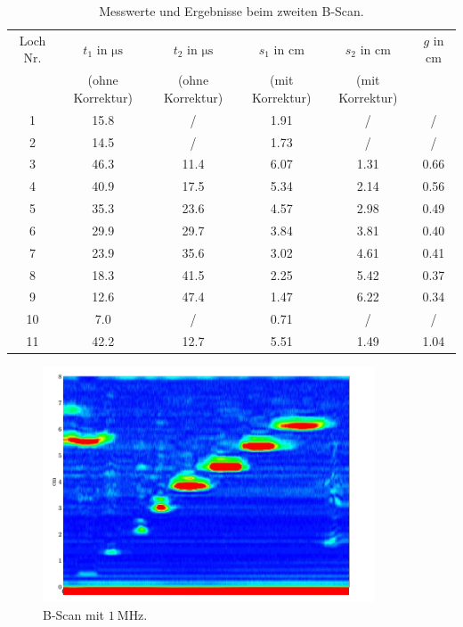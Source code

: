\documentclass[
  bibliography=totoc,     %
  captions=tableheading,  %
  titlepage=firstiscover, %
]{scrartcl}
\begin{document}
\begin{table}[H]
  \centering
  \caption{Messwerte und Ergebnisse beim zweiten B-Scan.}
  \label{tab:messwerte4}
  \begin{tabular}{S[table-format=2.1] S S S[table-format=1.2] S[table-format=1.2] S[table-format=2.2]}
    \toprule
    {Loch Nr.} & {$t_1$ in $\si{\micro\second}$} & {$t_2$ in $\si{\micro\second}$} & {$s_1$ in $\si{\centi\meter}$} & {$s_2$ in $\si{\centi\meter}$} & {$g$ in $\si{\centi\meter}$} \\
    & {(ohne Korrektur)} & {(ohne Korrektur)} & {(mit Korrektur)} & {(mit Korrektur)} & \\
     & 15.8 &   /  & 1.91 &  /   &  /   \\
     2 & 14.5 &   /  & 1.73 &  /   &  /   \\
     3 & 46.3 & 11.4 & 6.07 & 1.31 & 0.66 \\
     4 & 40.9 & 17.5 & 5.34 & 2.14 & 0.56 \\
     5 & 35.3 & 23.6 & 4.57 & 2.98 & 0.49 \\
     6 & 29.9 & 29.7 & 3.84 & 3.81 & 0.40 \\
     7 & 23.9 & 35.6 & 3.02 & 4.61 & 0.41 \\
     8 & 18.3 & 41.5 & 2.25 & 5.42 & 0.37 \\
     9 & 12.6 & 47.4 & 1.47 & 6.22 & 0.34 \\
    10 &  7.0 &   /  & 0.71 &  /   &  /   \\
    11 & 42.2 & 12.7 & 5.51 & 1.49 & 1.04 \\
    \bottomrule
  \end{tabular}
\end{table}
\begin{figure}[H]
  \centering
  \includegraphics[width=0.88\textwidth]{B-Scan1Mhz1.png}
  \caption{B-Scan mit $\SI{1}{\mega\hertz}$.}
  \label{fig:B-Scan1}
\end{figure}
\end{document}
